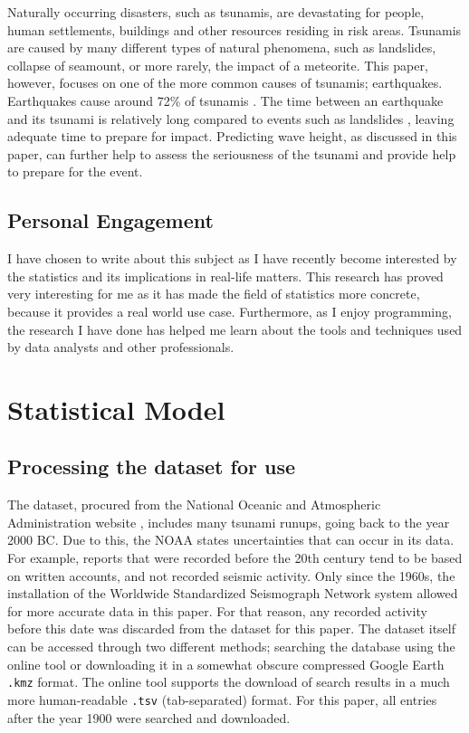 \documentclass[11pt,letterpaper]{article}
\begin{document}
Naturally occurring disasters, such as tsunamis, are devastating for people, human settlements, buildings and other resources residing in risk areas. Tsunamis are caused by many different types of natural phenomena, such as landslides, collapse of seamount, or more rarely, the impact of a meteorite. This paper, however, focuses on one of the more common causes of tsunamis; earthquakes. Earthquakes cause around 72\% of tsunamis \cite{pacifictsunamimuseum}. The time between an earthquake and its tsunami is relatively long compared to events such as landslides \cite{sue_nokes_walters}, leaving adequate time to prepare for impact. Predicting wave height, as discussed in this paper, can further help to assess the seriousness of the tsunami and provide help to prepare for the event.

\subsection{Personal Engagement}

I have chosen to write about this subject as I have recently become interested by the statistics and its implications in real-life matters. This research has proved very interesting for me as it has made the field of statistics more concrete, because it provides a real world use case. Furthermore, as I enjoy programming, the research I have done has helped me learn about the tools and techniques used by data analysts and other professionals.

\section{Statistical Model}

\subsection{Processing the dataset for use}

The dataset, procured from the National Oceanic and Atmospheric Administration website \cite{noaa}, includes many tsunami runups, going back to the year 2000 BC. Due to this, the NOAA states uncertainties that can occur in its data. For example, reports that were recorded before the 20th century tend to be based on written accounts, and not recorded seismic activity. Only since the 1960s, the installation of the Worldwide Standardized Seismograph Network system allowed for more accurate data in this paper. For that reason, any recorded activity before this date was discarded from the dataset for this paper. The dataset itself can be accessed through two different methods; searching the database using the online tool or downloading it in a somewhat obscure compressed Google Earth \verb|.kmz| format. The online tool supports the download of search results in a much more human-readable \verb|.tsv| (tab-separated) format. For this paper, all entries after the year 1900 were searched and downloaded.
\end{document}
